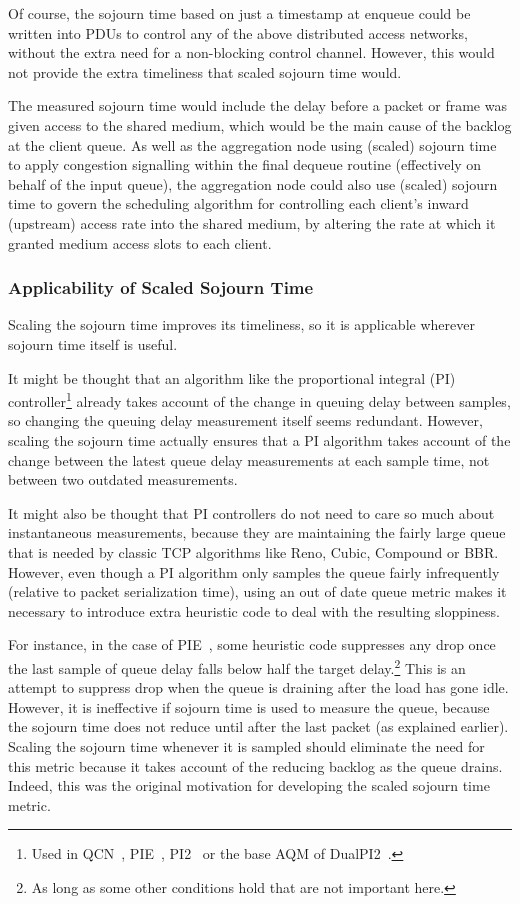 Of course, the sojourn time based on just a timestamp at enqueue could be written into PDUs to control any of the above distributed access networks, without the extra need for a non-blocking control channel. However, this would not provide the extra timeliness that scaled sojourn time would.

The measured sojourn time would include the delay before a packet or frame was given access to the shared medium, which would be the main cause of the backlog at the client queue. As well as the aggregation node using (scaled) sojourn time to apply congestion signalling within the final dequeue routine (effectively on behalf of the input queue), the aggregation node could also use (scaled) sojourn time to govern the scheduling algorithm for controlling each client's inward (upstream) access rate into the shared medium, by altering the rate at which it granted medium access slots to each client.

\subsubsection{Applicability of Scaled Sojourn Time}\label{sec:inst_svc_time_applic}

Scaling the sojourn time improves its timeliness, so it is applicable wherever sojourn time itself is useful.

It might be thought that an algorithm like the proportional integral (PI) controller\footnote{Used in QCN~\cite{IEEE802.1Qau:Ethernet_QCN}, PIE~\cite{Pan17:PIE}, PI2~\cite{DeSchepper16a:PI2} or the base AQM of DualPI2~\cite{Briscoe15e:DualQ-Coupled-AQM_ID}.} already takes account of the change in queuing delay between samples, so changing the queuing delay measurement itself seems redundant. However, scaling the sojourn time actually ensures that a PI algorithm takes account of the change between the latest queue delay measurements at each sample time, not between two outdated measurements.

It might also be thought that PI controllers do not need to care so much about instantaneous measurements, because they are maintaining the fairly large queue that is needed by classic TCP algorithms like Reno, Cubic, Compound or BBR. However, even though a PI algorithm only samples the queue fairly infrequently (relative to packet serialization time), using an out of date queue metric makes it necessary to introduce extra heuristic code to deal with the resulting sloppiness.

For instance, in the case of PIE~\cite{Pan17:PIE}, some heuristic code suppresses any drop once the last sample of queue delay falls below half the target delay.\footnote{As long as some other conditions hold that are not important here.} This is an attempt to suppress drop when the queue is draining after the load has gone idle. However, it is ineffective if sojourn time is used to measure the queue, because the sojourn time does not reduce until after the last packet (as explained earlier). Scaling the sojourn time whenever it is sampled should eliminate the need for this metric because it takes account of the reducing backlog as the queue drains. Indeed, this was the original motivation for developing the scaled sojourn time metric.

